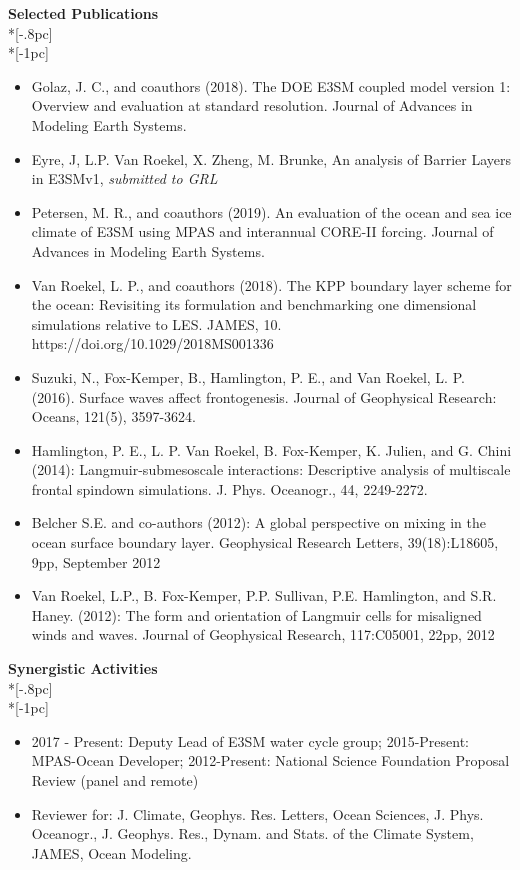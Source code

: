 \documentclass{article}
\begin{document}
\noindent
{\bf Selected Publications}\\*[-.8pc]
\underline{\hspace{6in}} \\*[-1pc]
\begin{itemize}

\item {Golaz, J. C., and coauthors (2018). The DOE E3SM coupled model version 1: Overview and evaluation at standard resolution. Journal of Advances in Modeling Earth Systems.}

\item {Eyre, J, L.P. Van Roekel, X. Zheng, M. Brunke, An analysis of Barrier Layers in E3SMv1, \textit{submitted to GRL}}

\item {Petersen, M. R., and coauthors (2019). An evaluation of the ocean and sea ice climate of E3SM using MPAS and interannual CORE‐II forcing. Journal of Advances in Modeling Earth Systems.}

\item {Van Roekel, L. P., and coauthors (2018). The KPP boundary layer scheme for the ocean: Revisiting its formulation and benchmarking one dimensional simulations relative to LES. JAMES, 10. https://doi.org/10.1029/2018MS001336}

\item {Suzuki, N., Fox-Kemper, B., Hamlington, P. E., and Van Roekel, L. P. (2016). Surface waves affect frontogenesis. Journal of Geophysical Research: Oceans, 121(5), 3597-3624.}

\item{Hamlington, P. E., L. P. Van Roekel, B. Fox-Kemper, K. Julien, and G. Chini (2014): Langmuir-submesoscale interactions: Descriptive analysis of multiscale frontal spindown simulations. J. Phys. Oceanogr., 44, 2249-2272.}

\item {Belcher S.E. and co-authors (2012): A global perspective on mixing in the ocean surface boundary layer. Geophysical Research Letters, 39(18):L18605, 9pp, September 2012}

\item Van Roekel, L.P., B. Fox-Kemper, P.P. Sullivan, P.E. Hamlington, and S.R. Haney. (2012):  The form and orientation of Langmuir cells for misaligned winds and waves.  Journal of Geophysical Research, 117:C05001, 22pp, 2012

\end{itemize}
\vskip-0.05in

\noindent
{\bf Synergistic Activities}\\*[-.8pc]
\underline{\hspace{6in}} \\*[-1pc]
\begin{itemize}
	\item 2017 - Present: Deputy Lead of E3SM water cycle group; 2015-Present: MPAS-Ocean Developer; 2012-Present: National Science Foundation Proposal Review (panel and remote)
	\item Reviewer for: J. Climate, Geophys. Res. Letters, Ocean Sciences, J. Phys. Oceanogr., J. Geophys. Res., Dynam. and Stats. of the Climate System, JAMES, Ocean Modeling.
\end{itemize}
\vskip-0.05in
\end{document}
